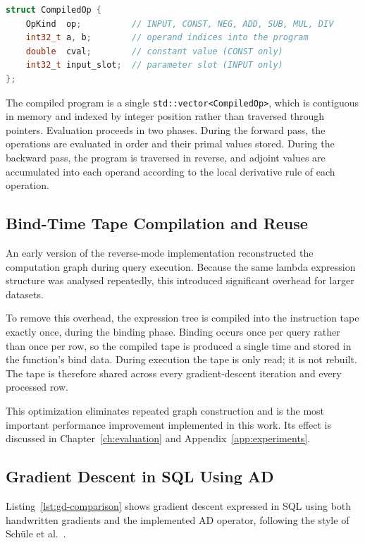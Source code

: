 \documentclass[12pt]{report}
\begin{document}
\begin{lstlisting}[language=C++]
struct CompiledOp {
    OpKind  op;          // INPUT, CONST, NEG, ADD, SUB, MUL, DIV
    int32_t a, b;        // operand indices into the program
    double  cval;        // constant value (CONST only)
    int32_t input_slot;  // parameter slot (INPUT only)
};
\end{lstlisting}

The compiled program is a single \texttt{std::vector<CompiledOp>}, which is contiguous in memory and indexed by integer position rather than traversed through pointers. Evaluation proceeds in two phases. During the forward pass, the operations are evaluated in order and their primal values stored. During the backward pass, the program is traversed in reverse, and adjoint values are accumulated into each operand according to the local derivative rule of each operation.

\subsection{Bind-Time Tape Compilation and Reuse}

An early version of the reverse-mode implementation reconstructed the computation graph during query execution. Because the same lambda expression structure was analysed repeatedly, this introduced significant overhead for larger datasets.

To remove this overhead, the expression tree is compiled into the instruction tape exactly once, during the binding phase. Binding occurs once per query rather than once per row, so the compiled tape is produced a single time and stored in the function's bind data. During execution the tape is only read; it is not rebuilt. The tape is therefore shared across every gradient-descent iteration and every processed row.

This optimization eliminates repeated graph construction and is the most important performance improvement implemented in this work. Its effect is discussed in Chapter~\ref{ch:evaluation} and Appendix~\ref{app:experiments}.

\subsection{Gradient Descent in SQL Using AD}

Listing~\ref{lst:gd-comparison} shows gradient descent expressed
in SQL using both handwritten gradients and the implemented AD
operator, following the style of Schüle et al.~\cite{schule2022llvm}.
\end{document}
